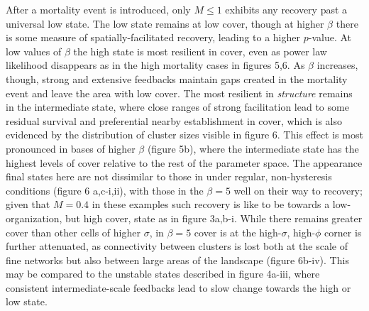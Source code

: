 \documentclass[10pt]{article}
\begin{document}
\begin{linenumbers}


After a mortality event is introduced, only $M \le 1$ exhibits any recovery past a universal low state. The low state remains at low cover, though at higher $\beta$ there is some measure of spatially-facilitated recovery, leading to a higher $p$-value. At low values of $\beta$ the high state is most resilient in cover, even as power law likelihood disappears as in the high mortality cases in figures 5,6. As $\beta$ increases, though, strong and extensive feedbacks maintain gaps created in the mortality event and leave the area with low cover. The most resilient in \textit{structure} remains in the intermediate state, where close ranges of strong facilitation lead to some residual survival and preferential nearby establishment in cover, which is also evidenced by the distribution of cluster sizes visible in figure 6. This effect is most pronounced in bases of higher $\beta$ (figure 5b), where the intermediate state has the highest levels of cover relative to the rest of the parameter space. The appearance final states here are not dissimilar to those in under regular, non-hysteresis conditions (figure 6 a,c-i,ii), with those in the $\beta = 5$ well on their way to recovery; given that $M = 0.4$ in these examples such recovery is like to be towards a low-organization, but high cover, state as in figure 3a,b-i.  While there remains greater cover than other cells of higher $\sigma$, in $\beta = 5$ cover is at the high-$\sigma$, high-$\phi$ corner is further attenuated, as connectivity between clusters is lost both at the scale of fine networks but also between large areas of the landscape (figure 6b-iv). This may be compared to the unstable states described in figure 4a-iii, where consistent intermediate-scale feedbacks lead to slow change towards the high or low state.





\end{linenumbers}
\end{document}

